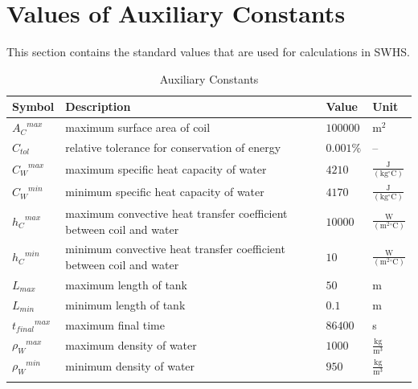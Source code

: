 \documentclass[12pt]{article}
\begin{document}
\section{Values of Auxiliary Constants}
\label{Sec:AuxConstants}
This section contains the standard values that are used for calculations in SWHS.
\begin{longtabu}{l X[l] l l}
\toprule
\textbf{Symbol} & \textbf{Description} & \textbf{Value} & \textbf{Unit}
\\
\midrule
\endhead
${{A_{C}}^{max}}$ & maximum surface area of coil & $100000$ & $\text{m}^{2}$
\\
${C_{tol}}$ & relative tolerance for conservation of energy & $0.001\%$ & --
\\
${{C_{W}}^{max}}$ & maximum specific heat capacity of water & $4210$ & $\frac{\text{J}}{(\text{kg}{}^{\circ}\text{C})}$
\\
${{C_{W}}^{min}}$ & minimum specific heat capacity of water & $4170$ & $\frac{\text{J}}{(\text{kg}{}^{\circ}\text{C})}$
\\
${{h_{C}}^{max}}$ & maximum convective heat transfer coefficient between coil and water & $10000$ & $\frac{\text{W}}{(\text{m}^{2}{}^{\circ}\text{C})}$
\\
${{h_{C}}^{min}}$ & minimum convective heat transfer coefficient between coil and water & $10$ & $\frac{\text{W}}{(\text{m}^{2}{}^{\circ}\text{C})}$
\\
${L_{max}}$ & maximum length of tank & $50$ & m
\\
${L_{min}}$ & minimum length of tank & $0.1$ & m
\\
${{t_{final}}^{max}}$ & maximum final time & $86400$ & s
\\
${{ρ_{W}}^{max}}$ & maximum density of water & $1000$ & $\frac{\text{kg}}{\text{m}^{3}}$
\\
${{ρ_{W}}^{min}}$ & minimum density of water & $950$ & $\frac{\text{kg}}{\text{m}^{3}}$
\\
\bottomrule
\caption{Auxiliary Constants}
\label{Table:TAuxConsts}
\end{longtabu}
\end{document}
